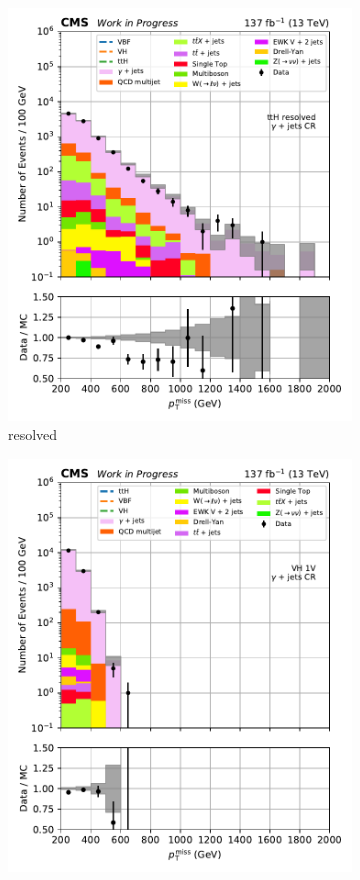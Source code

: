 \begin{figure}[htbp]
\begin{subfigure}[b]{0.24\textwidth}
        \includegraphics[width=\textwidth]{figures/region_plots/full_Run2/region_5/ttH_resolved.pdf}
        \caption{\ttH resolved}
    \end{subfigure}
    \hfill
    \begin{subfigure}[b]{0.24\textwidth}
        \includegraphics[width=\textwidth]{figures/region_plots/full_Run2/region_5/VH_1V.pdf}

\end{subfigure}
\end{figure}
